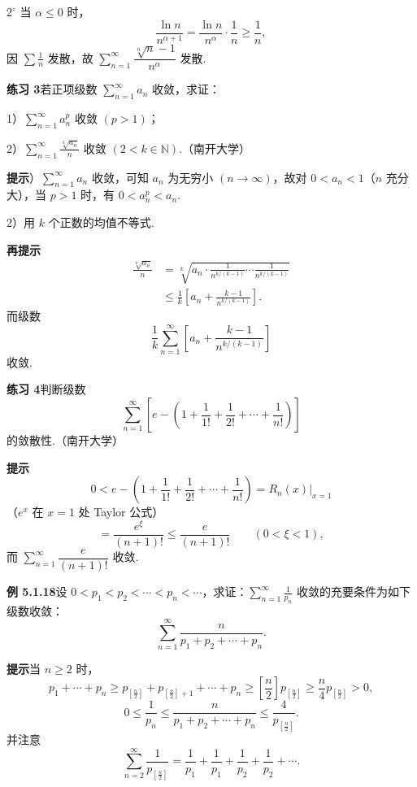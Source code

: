 \documentclass[UTF8, 12pt, fontset=fandol, oneside]{ctexart}
\begin{document}
$2^\circ$ 当 $\alpha\le0$ 时，
\[
  \frac{\ln n}{n^{\alpha+1}}=\frac{\ln n}{n^\alpha}\cdot\frac1n\ge\frac1n,
\]
因 $\displaystyle\sum\frac1n$ 发散，故 $\displaystyle\sum_{n=1}^\infty\dfrac{\sqrt[n]{n}-1}{n^\alpha}$ 发散.

\noindent\textbf{练习 3}\quad 若正项级数 $\displaystyle\sum_{n=1}^\infty a_n$ 收敛，求证：

1）$\displaystyle\sum_{n=1}^\infty a_n^p$ 收敛 $(p>1)$；

2）$\displaystyle\sum_{n=1}^\infty\frac{\sqrt[k]{a_n}}n$ 收敛 $(2<k\in\mathbb{N})$.（南开大学）

\noindent\textbf{提示}）$\displaystyle\sum_{n=1}^\infty a_n$ 收敛，可知 $a_n$ 为无穷小 $(n\to\infty)$，故对 $0<a_n<1$（$n$ 充分大），当 $p>1$ 时，有 $0<a_n^p<a_n$.

2）用 $k$ 个正数的均值不等式.

\noindent\textbf{再提示}\quad
\[
\begin{aligned}
\frac{\sqrt[k]{a_n}}n
&=\sqrt[k]{a_n\cdot
\frac1{n^{k/(k-1)}}\cdots\frac1{n^{k/(k-1)}}}\\
&\le\frac1k\left[a_n+\frac{k-1}{n^{k/(k-1)}}\right].
\end{aligned}
\]
而级数
\[
  \frac1k\sum_{n=1}^\infty\left[a_n+\frac{k-1}{n^{k/(k-1)}}\right]
\]
收敛.

\noindent\textbf{练习 4}\quad 判断级数
\[
  \sum_{n=1}^\infty\left[e-\left(1+\frac1{1!}+\frac1{2!}+\cdots+\frac1{n!}\right)\right]
\]
的敛散性.（南开大学）

\noindent\textbf{提示}\quad
\[
  0<e-\left(1+\frac1{1!}+\frac1{2!}+\cdots+\frac1{n!}\right)
  =R_n(x)\big|_{x=1}
\]
（$e^x$ 在 $x=1$ 处 Taylor 公式）
\[
  =\frac{e^\xi}{(n+1)!}\le\frac e{(n+1)!}\qquad(0<\xi<1),
\]
而 $\displaystyle\sum_{n=1}^\infty\dfrac e{(n+1)!}$ 收敛.

\noindent\textbf{例 5.1.18}\quad 设 $0<p_1<p_2<\cdots<p_n<\cdots$，求证：$\displaystyle\sum_{n=1}^\infty\frac1{p_n}$ 收敛的充要条件为如下级数收敛：
\[
  \sum_{n=1}^\infty\frac{n}{p_1+p_2+\cdots+p_n}.
\]

\noindent\textbf{提示}\quad 当 $n\ge2$ 时，
\[
  p_1+\cdots+p_n
  \ge p_{\left[\frac n2\right]}+p_{\left[\frac n2\right]+1}+\cdots+p_n
  \ge\left[\frac n2\right]p_{\left[\frac n2\right]}
  \ge\frac n4p_{\left[\frac n2\right]}>0,
\]
\[
  0\le\frac1{p_n}\le
  \frac{n}{p_1+p_2+\cdots+p_n}\le
  \frac4{p_{\left[\frac n2\right]}}.
\]
并注意
\[
  \sum_{n=2}^\infty\frac1{p_{\left[\frac n2\right]}}
  =\frac1{p_1}+\frac1{p_1}+\frac1{p_2}+\frac1{p_2}+\cdots.
\]
\end{document}
